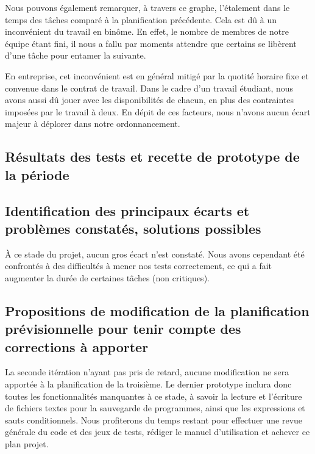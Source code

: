 \documentclass[12pt,a4paper,titlepage,openany, oneside]{report}
\begin{document}
    Nous pouvons également remarquer, à travers ce graphe, l'étalement dans le temps
    des tâches comparé à la planification précédente. Cela est dû à un inconvénient du
    travail en binôme. En effet, le nombre de membres de notre équipe étant fini, il nous
    a fallu par moments attendre que certains se libèrent d'une tâche pour entamer la
    suivante.

    En entreprise, cet inconvénient est en général mitigé par la quotité horaire
    fixe et convenue dans le contrat de travail. Dans le cadre d'un travail étudiant, nous
    avons aussi dû jouer avec les disponibilités de chacun, en plus des contraintes
    imposées par le travail à deux. En dépit de ces facteurs, nous n'avons aucun écart
    majeur à déplorer dans notre ordonnancement.


    \subsection{Résultats des tests et recette de prototype de la période}


    \subsection{Identification des principaux écarts et problèmes constatés, solutions possibles}
        \`{A} ce stade du projet, aucun gros écart n'est constaté. Nous avons cependant
        été confrontés à des difficultés à mener nos tests correctement, ce qui a fait
        augmenter la durée de certaines tâches (non critiques).

    \subsection{Propositions de modification de la planification prévisionnelle pour tenir compte des corrections à apporter}
        La seconde itération n'ayant pas pris de retard, aucune modification ne sera
        apportée à la planification de la troisième. Le dernier prototype inclura donc
        toutes les fonctionnalités manquantes à ce stade, à savoir la lecture et l'écriture
        de fichiers textes pour la sauvegarde de programmes, ainsi que les expressions
        et sauts conditionnels. Nous profiterons du temps restant pour effectuer une
        revue générale du code et des jeux de tests, rédiger le manuel d'utilisation et
        achever ce plan projet.
\end{document}
